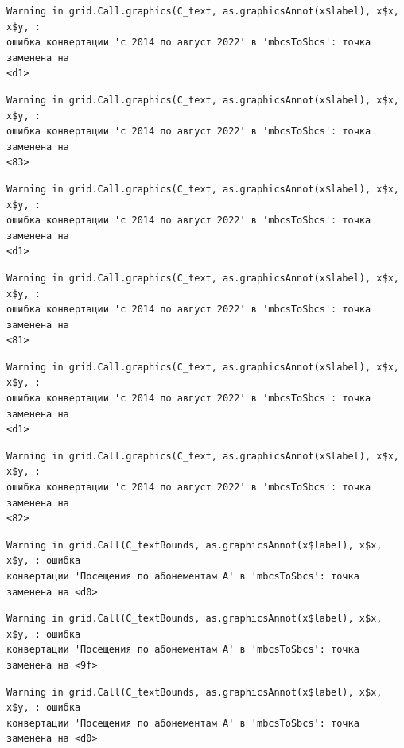 \documentclass[
  letterpaper,
  DIV=11,
  numbers=noendperiod]{scrreprt}
\begin{document}
\begin{verbatim}
Warning in grid.Call.graphics(C_text, as.graphicsAnnot(x$label), x$x, x$y, :
ошибка конвертации 'с 2014 по август 2022' в 'mbcsToSbcs': точка заменена на
<d1>
\end{verbatim}

\begin{verbatim}
Warning in grid.Call.graphics(C_text, as.graphicsAnnot(x$label), x$x, x$y, :
ошибка конвертации 'с 2014 по август 2022' в 'mbcsToSbcs': точка заменена на
<83>
\end{verbatim}

\begin{verbatim}
Warning in grid.Call.graphics(C_text, as.graphicsAnnot(x$label), x$x, x$y, :
ошибка конвертации 'с 2014 по август 2022' в 'mbcsToSbcs': точка заменена на
<d1>
\end{verbatim}

\begin{verbatim}
Warning in grid.Call.graphics(C_text, as.graphicsAnnot(x$label), x$x, x$y, :
ошибка конвертации 'с 2014 по август 2022' в 'mbcsToSbcs': точка заменена на
<81>
\end{verbatim}

\begin{verbatim}
Warning in grid.Call.graphics(C_text, as.graphicsAnnot(x$label), x$x, x$y, :
ошибка конвертации 'с 2014 по август 2022' в 'mbcsToSbcs': точка заменена на
<d1>
\end{verbatim}

\begin{verbatim}
Warning in grid.Call.graphics(C_text, as.graphicsAnnot(x$label), x$x, x$y, :
ошибка конвертации 'с 2014 по август 2022' в 'mbcsToSbcs': точка заменена на
<82>
\end{verbatim}

\begin{verbatim}
Warning in grid.Call(C_textBounds, as.graphicsAnnot(x$label), x$x, x$y, : ошибка
конвертации 'Посещения по абонементам А' в 'mbcsToSbcs': точка заменена на <d0>
\end{verbatim}

\begin{verbatim}
Warning in grid.Call(C_textBounds, as.graphicsAnnot(x$label), x$x, x$y, : ошибка
конвертации 'Посещения по абонементам А' в 'mbcsToSbcs': точка заменена на <9f>
\end{verbatim}

\begin{verbatim}
Warning in grid.Call(C_textBounds, as.graphicsAnnot(x$label), x$x, x$y, : ошибка
конвертации 'Посещения по абонементам А' в 'mbcsToSbcs': точка заменена на <d0>
\end{verbatim}
\end{document}
